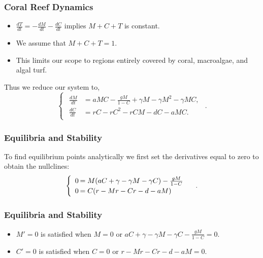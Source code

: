 \documentclass{beamer}
\begin{document}
\begin{frame}\frametitle{Coral Reef Dynamics}

\hspace{1.57em}

\begin{itemize}
\item $\frac{dT}{dt}=-\frac{dM}{dt}-\frac{dC}{dt}$ implies $M+C+T$ is
  constant.
\item We assume that $M+C+T=1$.
\item This limits our scope to regions entirely covered by coral,
  macroalgae, and algal turf. 
\end{itemize}

Thus we reduce our system to, 
$$\begin{cases}
\begin{array}{rl}
\frac{dM}{dt}&= aMC-\frac{gM}{1-C} + \gamma M - \gamma M^2 -\gamma M C,\\
\frac{dC}{dt}&=rC - rC^2 - rCM - dC - aMC.
\end{array} 
\end{cases}.$$
\end{frame}

\begin{frame}\frametitle{Equilibria and Stability}
To find equilibrium points analytically we first set the derivatives equal to zero to obtain the nullclines:
$$\begin{cases}
\begin{array}{rl}
0\hspace{-.8em}&=M(aC + \gamma-\gamma M-\gamma C) - \frac{gM}{1-C}\\
0\hspace{-.8em}&=C(r-Mr-Cr - d - aM)\\
\end{array}
\end{cases}.$$
\end{frame}

\begin{frame}\frametitle{Equilibria and Stability}\begin{itemize}
\item $M'=0$ is satisfied when $M=0$ or $aC + \gamma - \gamma M - \gamma C - \frac{gM}{1-C}=0$.
\item $C'=0$ is satisfied when $C=0$ or $r-Mr-Cr-d-aM=0$.
\end{itemize}
\end{frame}
\end{document}
